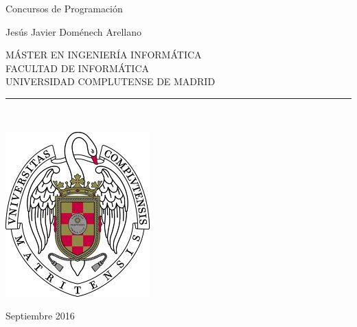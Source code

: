 \newpage

\thispagestyle{empty}

\begin{center}

   \vspace{1cm}

   {\huge Concursos de Programaci{\'o}n}\\[2ex]


   \vspace{0.5cm}

   \vspace{0.5cm}

   {\large Jes\'us Javier Dom\'enech Arellano}\\

   \vspace{0.5cm}

   MÁSTER EN INGENIERÍA INFORMÁTICA \\
   FACULTAD DE INFORMÁTICA\\
   UNIVERSIDAD COMPLUTENSE DE MADRID \\

   \vspace{0.65cm}
   \rule{2in}{0.5pt}\\
   \vspace{0.85cm}

  \includegraphics[height=2.5in]{fig/UCM.jpg}
  
   \vspace{0.5cm}

   \vspace{0.5cm}

  Septiembre 2016\\
   \vspace{1cm}

\end{center}


